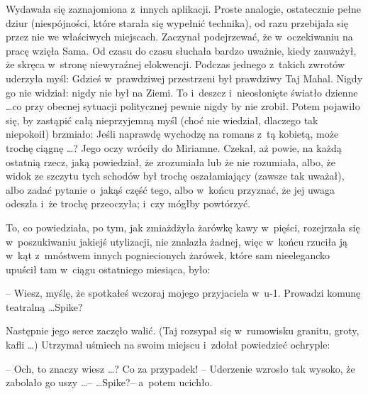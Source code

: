 \documentclass[oneside,polish,11pt,rmheadings]{mwbk}
\begin{document}
Wydawała się zaznajomiona z~innych aplikacji. Proste analogie, ostatecznie pełne dziur (niespójności, które starała się wypełnić technika), od razu przebijała się przez nie we właściwych miejscach. Zaczynał podejrzewać, że w~oczekiwaniu na pracę wzięła Sama. Od czasu do czasu słuchała bardzo uważnie, kiedy zauważył, że skręca w~stronę niewyraźnej elokwencji. Podczas jednego z~takich zwrotów uderzyła myśl: Gdzieś w~prawdziwej przestrzeni był prawdziwy Taj Mahal. Nigdy go nie widział: nigdy nie był na Ziemi. To i~deszcz i~nieosłonięte światło dzienne \ldots  co przy obecnej sytuacji politycznej pewnie nigdy by nie zrobił. Potem pojawiło się, by zastąpić całą nieprzyjemną myśl (choć nie wiedział, dlaczego tak niepokoił) brzmiało: Jeśli naprawdę wychodzę na romans z~tą kobietą, może trochę ciągnę \ldots  ? Jego oczy wróciły do Miriamne. Czekał, aż powie, na każdą ostatnią rzecz, jaką powiedział, że zrozumiała lub że nie rozumiała, albo, że widok ze szczytu tych schodów był trochę oszałamiający (zawsze tak uważał), albo zadać pytanie o~jakąś część tego, albo w~końcu przyznać, że jej uwaga odeszła i~że trochę przeoczyła; i~czy mógłby powtórzyć. 

To, co powiedziała, po tym, jak zmiażdżyła żarówkę kawy w~pięści, rozejrzała się w~poszukiwaniu jakiejś utylizacji, nie znalazła żadnej, więc w~końcu rzuciła ją w~kąt z~mnóstwem innych pogniecionych żarówek, które sam nieelegancko upuścił tam w~ciągu ostatniego miesiąca, było: 

-- Wiesz, myślę, że spotkałeś wczoraj mojego przyjaciela w~u-1.  Prowadzi komunę teatralną \ldots  Spike? 

Następnie jego serce zaczęło walić. (Taj rozsypał się w~rumowisku granitu, groty, kafli \ldots ) Utrzymał uśmiech na swoim miejscu i~zdołał powiedzieć ochryple: 

-- Och, to znaczy wiesz \ldots  ?  Co za przypadek! -- Uderzenie wzrosło tak wysoko, że zabolało go uszy \ldots  --  \ldots  Spike?-- a~potem ucichło.  
\end{document}
